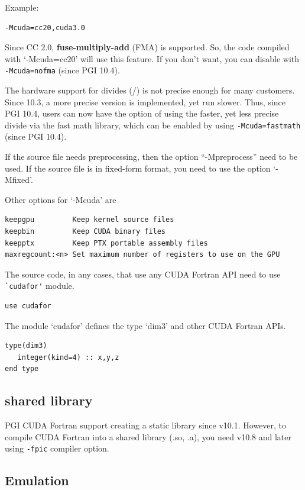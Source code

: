 Example:
\begin{verbatim}
-Mcuda=cc20,cuda3.0
\end{verbatim}

Since CC 2.0, {\bf fuse-multiply-add} (FMA) is supported. So, the code
compiled with `-Mcuda=cc20' will use this feature. If you don't want,
you can disable with \verb!-Mcuda=nofma! (since PGI 10.4). 

The hardware support for divides (/) is not precise enough for many
customers. Since 10.3, a more precise version is implemented, yet run
slower. Thus, since PGI 10.4, users can now have the option of using
the faster, yet less precise divide via the fast math library, which
can be enabled by using \verb!-Mcuda=fastmath! (since PGI 10.4).

If the source file needs preprocessing, then the option
``-Mpreprocess'' need to be used. If the source file is in fixed-form
format, you need to use the option `-Mfixed'. 

Other options for `-Mcuda' are
\begin{verbatim}
keepgpu         Keep kernel source files
keepbin         Keep CUDA binary files
keepptx         Keep PTX portable assembly files
maxregcount:<n> Set maximum number of registers to use on the GPU
\end{verbatim}

The source code, in any cases, that use any CUDA Fortran API need to
use \verb!`cudafor'! module.
\begin{lstlisting}
use cudafor
\end{lstlisting}
The module `cudafor' defines the type `dim3' and other CUDA Fortran
APIs.
\begin{lstlisting}
type(dim3)
   integer(kind=4) :: x,y,z
end type
\end{lstlisting}


\subsection{shared library}
\label{sec:shared-library}

PGI CUDA Fortran support creating a static library since
v10.1. However, to compile CUDA Fortran into a shared library (.so,
.a), you need v10.8 and later using \verb!-fpic! compiler option.


\subsection{Emulation}
\label{sec:emulation}

